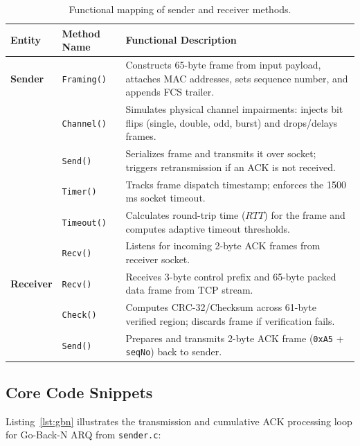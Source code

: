 \documentclass[11pt,a4paper]{article}
\begin{document}
\begin{table}[htbp]
    \centering
    \small
    \begin{tabularx}{\textwidth}{ll>{\RaggedRight\arraybackslash}X}
        \toprule
        \textbf{Entity} & \textbf{Method Name} & \textbf{Functional Description} \\
        \midrule
        \textbf{Sender} & \texttt{Framing()} & Constructs 65-byte frame from input payload, attaches MAC addresses, sets sequence number, and appends FCS trailer. \\
        & \texttt{Channel()} & Simulates physical channel impairments: injects bit flips (single, double, odd, burst) and drops/delays frames. \\
        & \texttt{Send()} & Serializes frame and transmits it over socket; triggers retransmission if an ACK is not received. \\
        & \texttt{Timer()} & Tracks frame dispatch timestamp; enforces the 1500 ms socket timeout. \\
        & \texttt{Timeout()} & Calculates round-trip time (\(RTT\)) for the frame and computes adaptive timeout thresholds. \\
        & \texttt{Recv()} & Listens for incoming 2-byte ACK frames from receiver socket. \\
        \midrule
        \textbf{Receiver} & \texttt{Recv()} & Receives 3-byte control prefix and 65-byte packed data frame from TCP stream. \\
        & \texttt{Check()} & Computes CRC-32/Checksum across 61-byte verified region; discards frame if verification fails. \\
        & \texttt{Send()} & Prepares and transmits 2-byte ACK frame (\texttt{0xA5} + \texttt{seqNo}) back to sender. \\
        \bottomrule
    \end{tabularx}
    \caption{Functional mapping of sender and receiver methods.}
    \label{tab:methods}
\end{table}

\subsection{Core Code Snippets}

Listing~\ref{lst:gbn} illustrates the transmission and cumulative ACK processing loop for Go-Back-N ARQ from \texttt{sender.c}:
\end{document}
